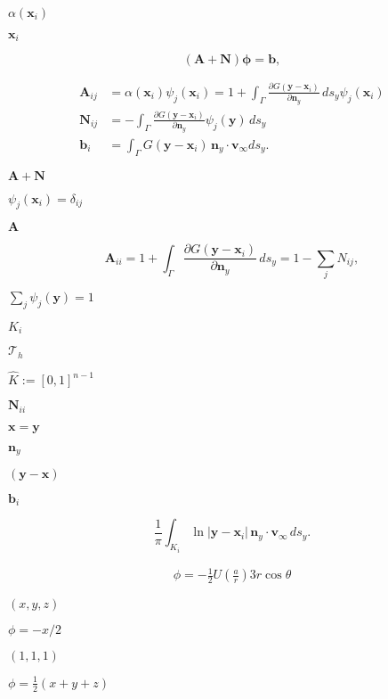 \documentclass{article}
\begin{document}
$\alpha(\mathbf{x}_i)$
\pagebreak

$\mathbf{x}_i$
\pagebreak

\[ \label{eq:linear-system} (\mathbf{A}+\mathbf{N})\boldsymbol\phi = \mathbf{b}, \]
\pagebreak

\[ \begin{aligned} \mathbf{A}_{ij}&= \alpha(\mathbf{x}_i) \psi_j(\mathbf{x}_i) = 1+\int_\Gamma \frac{\partial G(\mathbf{y}-\mathbf{x}_i)}{\partial \mathbf{n}_y}\,ds_y \psi_j(\mathbf{x}_i) \\ \mathbf{N}_{ij}&= - \int_\Gamma \frac{\partial G(\mathbf{y}-\mathbf{x}_i)}{\partial \mathbf{n}_y} \psi_j(\mathbf{y}) \,ds_y \\ \mathbf{b}_i&= \int_\Gamma G(\mathbf{y}-\mathbf{x}_i) \, \mathbf{n}_y\cdot\mathbf{v_\infty} ds_y. \end{aligned} \]
\pagebreak

$\mathbf{A}+\mathbf{N}$
\pagebreak

$\psi_j(\mathbf{x}_i)=\delta_{ij}$
\pagebreak

$\mathbf{A}$
\pagebreak

\[ \mathbf{A}_{ii} = 1+\int_\Gamma \frac{\partial G(\mathbf{y}-\mathbf{x}_i)}{\partial \mathbf{n}_y}\,ds_y = 1-\sum_j N_{ij}, \]
\pagebreak

$\sum_j \psi_j(\mathbf{y})=1$
\pagebreak

$K_i$
\pagebreak

$\mathcal{T}_h$
\pagebreak

$\hat K := [0,1]^{n-1}$
\pagebreak

$\mathbf{N}_{ii}$
\pagebreak

$\mathbf{x}=\mathbf{y}$
\pagebreak

$\mathbf{n}_y$
\pagebreak

$(\mathbf{y}-\mathbf{x})$
\pagebreak

$\mathbf{b}_i$
\pagebreak

\[ \frac{1}{\pi} \int_{K_i} \ln|\mathbf{y}-\mathbf{x}_i| \, \mathbf{n}_y\cdot\mathbf{v_\infty} \,ds_y. \]
\pagebreak

\begin{align*} \phi = -\frac{1}{2}U \left(\frac{a}{r}\right)3 r \cos\theta \end{align*}
\pagebreak

$(x,y,z)$
\pagebreak

$\phi = -x/2$
\pagebreak

$(1,1,1)$
\pagebreak

$\phi = \frac{1}{2}(x + y + z)$
\pagebreak
\end{document}
